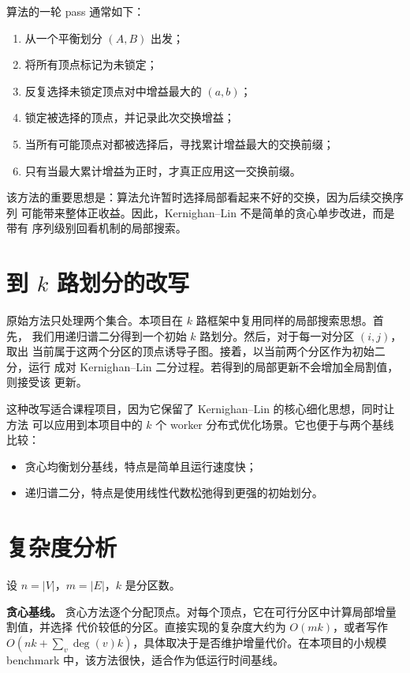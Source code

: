 \documentclass[UTF8, 11pt]{ctexart}
\begin{document}
算法的一轮 pass 通常如下：
\begin{enumerate}
    \item 从一个平衡划分 $(A,B)$ 出发；
    \item 将所有顶点标记为未锁定；
    \item 反复选择未锁定顶点对中增益最大的 $(a,b)$；
    \item 锁定被选择的顶点，并记录此次交换增益；
    \item 当所有可能顶点对都被选择后，寻找累计增益最大的交换前缀；
    \item 只有当最大累计增益为正时，才真正应用这一交换前缀。
\end{enumerate}

该方法的重要思想是：算法允许暂时选择局部看起来不好的交换，因为后续交换序列
可能带来整体正收益。因此，Kernighan--Lin 不是简单的贪心单步改进，而是带有
序列级别回看机制的局部搜索。

\section{到 $k$ 路划分的改写}

原始方法只处理两个集合。本项目在 $k$ 路框架中复用同样的局部搜索思想。首先，
我们用递归谱二分得到一个初始 $k$ 路划分。然后，对于每一对分区 $(i,j)$，取出
当前属于这两个分区的顶点诱导子图。接着，以当前两个分区作为初始二分，运行
成对 Kernighan--Lin 二分过程。若得到的局部更新不会增加全局割值，则接受该
更新。

这种改写适合课程项目，因为它保留了 Kernighan--Lin 的核心细化思想，同时让方法
可以应用到本项目中的 $k$ 个 worker 分布式优化场景。它也便于与两个基线比较：
\begin{itemize}
    \item 贪心均衡划分基线，特点是简单且运行速度快；
    \item 递归谱二分，特点是使用线性代数松弛得到更强的初始划分。
\end{itemize}

\section{复杂度分析}

设 $n=|V|$，$m=|E|$，$k$ 是分区数。

\textbf{贪心基线。}
贪心方法逐个分配顶点。对每个顶点，它在可行分区中计算局部增量割值，并选择
代价较低的分区。直接实现的复杂度大约为 $O(mk)$，或者写作
$O(nk+\sum_v \deg(v)k)$，具体取决于是否维护增量代价。在本项目的小规模
benchmark 中，该方法很快，适合作为低运行时间基线。
\end{document}
